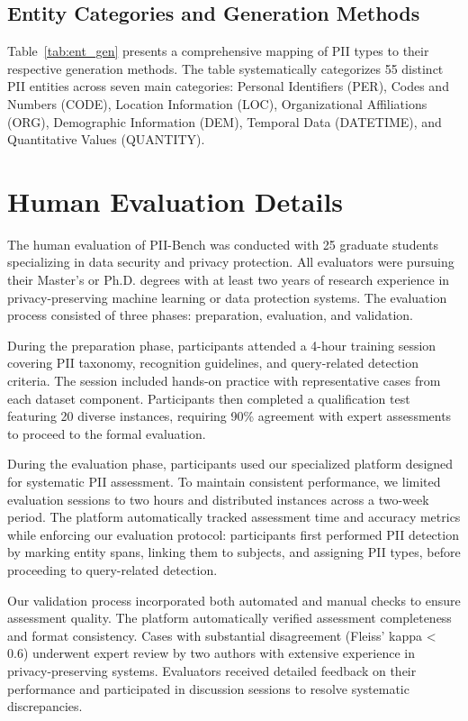 \subsection{Entity Categories and Generation Methods}
Table~\ref{tab:ent_gen} presents a comprehensive mapping of PII types to their respective generation methods. The table systematically categorizes 55 distinct PII entities across seven main categories: Personal Identifiers (PER), Codes and Numbers (CODE), Location Information (LOC), Organizational Affiliations (ORG), Demographic Information (DEM), Temporal Data (DATETIME), and Quantitative Values (QUANTITY).

\section{Human Evaluation Details}
\label{sec:human_eval}
The human evaluation of PII-Bench was conducted with 25 graduate students specializing in data security and privacy protection. All evaluators were pursuing their Master's or Ph.D. degrees with at least two years of research experience in privacy-preserving machine learning or data protection systems. The evaluation process consisted of three phases: preparation, evaluation, and validation.

During the preparation phase, participants attended a 4-hour training session covering PII taxonomy, recognition guidelines, and query-related detection criteria. The session included hands-on practice with representative cases from each dataset component. Participants then completed a qualification test featuring 20 diverse instances, requiring 90\% agreement with expert assessments to proceed to the formal evaluation.

During the evaluation phase, participants used our specialized platform designed for systematic PII assessment. To maintain consistent performance, we limited evaluation sessions to two hours and distributed instances across a two-week period. The platform automatically tracked assessment time and accuracy metrics while enforcing our evaluation protocol: participants first performed PII detection by marking entity spans, linking them to subjects, and assigning PII types, before proceeding to query-related detection.

Our validation process incorporated both automated and manual checks to ensure assessment quality. The platform automatically verified assessment completeness and format consistency. Cases with substantial disagreement (Fleiss' kappa < 0.6) underwent expert review by two authors with extensive experience in privacy-preserving systems. Evaluators received detailed feedback on their performance and participated in discussion sessions to resolve systematic discrepancies.

